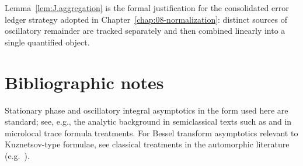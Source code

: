 \begin{remark}[Interpretation]
\label{rem:J.aggregation.interp}
Lemma~\ref{lem:J.aggregation} is the formal justification for the consolidated error ledger strategy adopted in
Chapter~\ref{chap:08-normalization}: distinct sources of oscillatory remainder are tracked separately and then combined
linearly into a single quantified object.
\end{remark}

\section*{Bibliographic notes}

Stationary phase and oscillatory integral asymptotics in the form used here are standard; see, e.g., the analytic
background in semiclassical texts such as \cite{Zworski2012} and in microlocal trace formula treatments.
For Bessel transform asymptotics relevant to Kuznetsov-type formulae, see classical treatments in the automorphic
literature (e.g.\ \cite{Iwaniec2002}).

